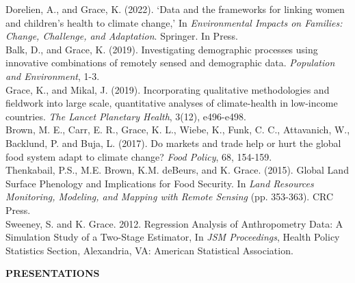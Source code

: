 \documentclass[11pt]{article} %
\begin{document}
\noindent
Dorelien, A., and Grace, K. (2022). `Data and the frameworks for linking women and children’s health to climate change,' In \textit{Environmental Impacts on Families: Change, Challenge, and Adaptation}. Springer.  In Press.\\

\noindent
Balk, D., and Grace, K. (2019). Investigating demographic processes using innovative combinations of remotely sensed and demographic data. \textit{Population and Environment}, 1-3.\\

\noindent
Grace, K., and Mikal, J. (2019). Incorporating qualitative methodologies and fieldwork into large scale, quantitative analyses of climate-health in low-income countries. \textit{The Lancet Planetary Health}, 3(12), e496-e498.\\

\noindent
Brown, M. E., Carr, E. R., Grace, K. L., Wiebe, K., Funk, C. C., Attavanich, W., Backlund, P. and Buja, L. (2017). Do markets and trade help or hurt the global food system adapt to climate change? \textit{Food Policy}, 68, 154-159.\\

\noindent
Thenkabail, P.S., M.E. Brown, K.M. deBeurs, and K. Grace. (2015). Global Land Surface Phenology and Implications for Food Security. In \textit{Land Resources Monitoring, Modeling, and Mapping with Remote Sensing} (pp. 353-363). CRC Press. \\

\noindent
Sweeney, S. and K. Grace. 2012. Regression Analysis of Anthropometry
Data: A Simulation Study of a Two-Stage Estimator, In \textit{JSM
Proceedings}, Health Policy Statistics Section, Alexandria, VA:
American Statistical Association. \\



\vspace{.5cm}

\noindent
{\large \textbf{PRESENTATIONS}}
\vspace{.5cm}
\end{document}
